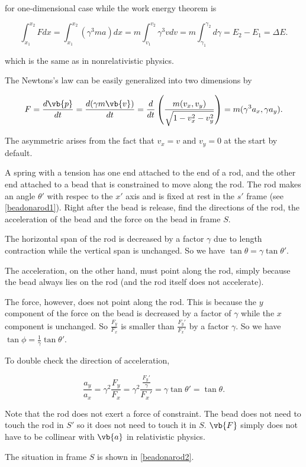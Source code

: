 \documentclass[english,a4paper,12pt]{report}
\begin{document}
for one-dimensional case while the work energy theorem is 

\begin{equation}
    \int_{x_1 }^{x_2 } Fdx = \int_{x_1 }^{x_2 } (\gamma ^3 ma) dx = m \int_{v_1 }^{v_2 } \gamma ^3 vdv = m \int_{\gamma _{1} }^{\gamma _{2} } d\gamma = E_2 - E_1 = \Delta E.      
\end{equation}

which is the same as in nonrelativistic physics.

The Newtons's law can be easily generalized into two dimensions by 

\begin{equation}
    F = \frac{d\vb{p} }{dt} = \frac{d(\gamma m\vb{v} )}{dt} = \frac{d}{dt} \left(\frac{m(v_{x}, v_{y}  )}{\sqrt{1 - v_{x}^2 - v_{y}^2  } }\right) = m(\gamma ^3 a_{x}, \gamma a_{y}  ).    
\end{equation}

The asymmetric arises from the fact that \(v_{x} = v \text { and }  v_{y} = 0 \) at the start by default.

{A spring with a tension has one end attached to the end of a rod, and the other end attached to a bead that is constrained to move along the rod. The rod makes an angle \(\theta '\) with respec to the \(x'\) axis and is fixed at rest in the \(s'\) frame (see \cref{beadonarod1}). Right after the bead is release, find the directions of the rod, the acceleration of the bead and the force on the bead in frame \(S\).}
{The horizontal span of the rod is decreased by a factor \(\gamma \) due to length contraction while the vertical span is unchanged. So we have \(\tan \theta = \gamma \tan \theta '\). 

The acceleration, on the other hand, must point along the rod, simply because the bead always lies on the rod (and the rod itself does not accelerate). 

The force, however, does not point along the rod. This is because the \(y\) component of the force on the bead is decreased by a factor of \(\gamma \) while the \(x\) component is unchanged. So \(\frac{F_{y}}{F_{x} } \) is smaller than \(\frac{F_{y}'}{F_{x}'} \) by a factor \(\gamma \). So we have \(\tan \phi = \frac{1}{\gamma }\tan \theta ' \). 

To double check the direction of acceleration, 

\begin{equation}
    \frac{a_{y} }{a_{x} } = \gamma ^2 \frac{F_{y} }{F_{x} } = \gamma ^2\frac{\frac{F_{y}' }{\gamma }  }{F_{x}' }  = \gamma \tan \theta ' = \tan \theta .  
\end{equation}

Note that the rod does not exert a force of constraint. The bead does not need to touch the rod in \(S'\) so it does not need to touch it in \(S\). \(\vb{F} \) simply does not have to be collinear with \(\vb{a} \) in relativistic physics.  

The situation in frame \(S\) is shown in \cref{beadonarod2}.

} 
\end{document}
